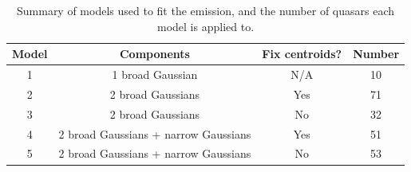 \begin{table}
  \centering
  \footnotesize 
  \caption{Summary of models used to fit the \ha emission, and the number of quasars each model is applied to.}
  \label{tab:hamod}
    \begin{tabular}{cccc} 
    \hline
    Model     & Components & Fix centroids? & Number \\
    \hline
    1        & 1 broad Gaussian  & N/A &  10 \\
    2        & 2 broad Gaussians & Yes &  71 \\
    3        & 2 broad Gaussians & No  &  32 \\
    4        & 2 broad Gaussians + narrow Gaussians & Yes & 51 \\
    5        & 2 broad Gaussians + narrow Gaussians & No  & 53 \\
    \hline
    \end{tabular}
\end{table} 

